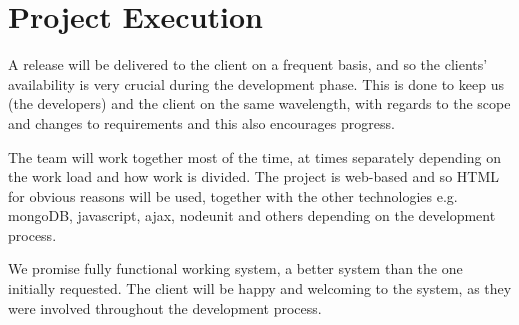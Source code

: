 \documentclass[12pt]{article}
\begin{document}


\newpage
\tableofcontents

\newpage



\newpage

\section{Project Execution}
\par{A release will be delivered to the client on a frequent basis, and so the clients’ availability is very crucial during the development phase. This is done to keep us (the developers) and the client on the same wavelength, with regards to the scope and changes to requirements and this also encourages progress. 
}
\\
\par{The team will work together most of the time, at times separately depending on the work load and how work is divided. The project is web-based and so HTML for obvious reasons will be used, together with the other technologies e.g. mongoDB, javascript, ajax, nodeunit and others depending on the development process.
}
\\
\par{We promise fully functional working system, a better system than the one initially requested. The client will be happy and welcoming to the system, as they were involved throughout the development process.
}
\end{document}

